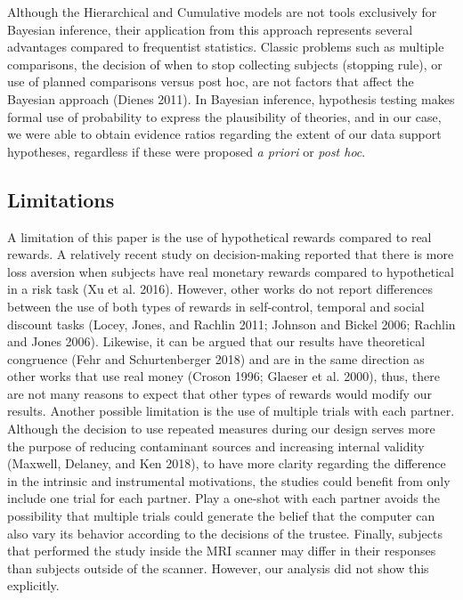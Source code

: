\documentclass[smallextended]{svjour3}       %
\begin{document}
Although the Hierarchical and Cumulative models are not tools
exclusively for Bayesian inference, their application from this approach
represents several advantages compared to frequentist statistics.
Classic problems such as multiple comparisons, the decision of when to
stop collecting subjects (stopping rule), or use of planned comparisons
versus post hoc, are not factors that affect the Bayesian approach
(Dienes 2011). In Bayesian inference, hypothesis testing makes formal
use of probability to express the plausibility of theories, and in our
case, we were able to obtain evidence ratios regarding the extent of our
data support hypotheses, regardless if these were proposed \emph{a
priori} or \emph{post hoc}.

\hypertarget{limitations}{%
\subsection{Limitations}\label{limitations}}

A limitation of this paper is the use of hypothetical rewards compared
to real rewards. A relatively recent study on decision-making reported
that there is more loss aversion when subjects have real monetary
rewards compared to hypothetical in a risk task (Xu et al. 2016).
However, other works do not report differences between the use of both
types of rewards in self-control, temporal and social discount tasks
(Locey, Jones, and Rachlin 2011; Johnson and Bickel 2006; Rachlin and
Jones 2006). Likewise, it can be argued that our results have
theoretical congruence (Fehr and Schurtenberger 2018) and are in the
same direction as other works that use real money (Croson 1996; Glaeser
et al. 2000), thus, there are not many reasons to expect that other
types of rewards would modify our results. Another possible limitation
is the use of multiple trials with each partner. Although the decision
to use repeated measures during our design serves more the purpose of
reducing contaminant sources and increasing internal validity (Maxwell,
Delaney, and Ken 2018), to have more clarity regarding the difference in
the intrinsic and instrumental motivations, the studies could benefit
from only include one trial for each partner. Play a one-shot with each
partner avoids the possibility that multiple trials could generate the
belief that the computer can also vary its behavior according to the
decisions of the trustee. Finally, subjects that performed the study
inside the MRI scanner may differ in their responses than subjects
outside of the scanner. However, our analysis did not show this
explicitly.
\end{document}
